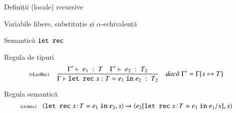 \documentclass[xcolor=pdftex,romanian,colorlinks]{beamer}
\begin{document}
\begin{section}{Definiții (locale) recursive}
\begin{frame}{Variabile libere, substituție și $\alpha$-echivalență}
\begin{itemize}
\end{itemize}
\end{frame}

\begin{frame}{Semantică $\mathrel{\text{\ttfamily let rec}}$}

\begin{block}{Regula de tipuri}
\[\reg[tLetRec]{\tjud{\Sletrec x : T = e_1 \Sin e_2}{T_2}}{\tjud[\Gamma']{e_1}{T}\si\tjud[\Gamma']{e_2}{T_2}}{\Gamma' = \Gamma[x\mapsto T]}
\]
\end{block}

\vfill
\begin{block}{Regula semantică}
\[\reg[letrec]{\!\Ss{\c{\Sletrec x\!:\!T = e_1 \Sin e_2,s}}{\c{e_2[\Sletrec x\!:\!T = e_1 \Sin e_1/x],s}}}{}{}\]
\end{block}
\end{frame}



\end{section}
\end{document}
